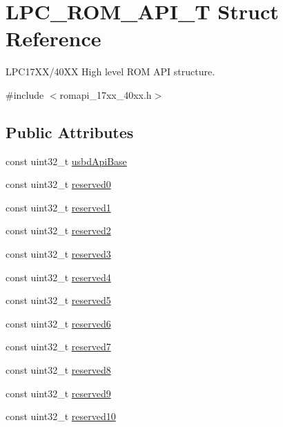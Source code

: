 \hypertarget{struct_l_p_c___r_o_m___a_p_i___t}{\section{L\+P\+C\+\_\+\+R\+O\+M\+\_\+\+A\+P\+I\+\_\+\+T Struct Reference}
\label{struct_l_p_c___r_o_m___a_p_i___t}
}


L\+P\+C17\+X\+X/40\+X\+X High level R\+O\+M A\+P\+I structure.  




{\ttfamily \#include $<$romapi\+\_\+17xx\+\_\+40xx.\+h$>$}

\subsection*{Public Attributes}
\begin{DoxyCompactItemize}
\item 
const uint32\+\_\+t \hyperlink{struct_l_p_c___r_o_m___a_p_i___t_a94bc8146ba697eeadc992d4985971550}{usbd\+Api\+Base}
\item 
const uint32\+\_\+t \hyperlink{struct_l_p_c___r_o_m___a_p_i___t_a93487c5be9000ba3b633bd6c354f8589}{reserved0}
\item 
const uint32\+\_\+t \hyperlink{struct_l_p_c___r_o_m___a_p_i___t_a2fce9202473b5986d54262b3d5548e82}{reserved1}
\item 
const uint32\+\_\+t \hyperlink{struct_l_p_c___r_o_m___a_p_i___t_a0ab9f56adf03f0f69b04baa60bcc271a}{reserved2}
\item 
const uint32\+\_\+t \hyperlink{struct_l_p_c___r_o_m___a_p_i___t_a70c7b14958f6d5af166224d04148e945}{reserved3}
\item 
const uint32\+\_\+t \hyperlink{struct_l_p_c___r_o_m___a_p_i___t_a1d3193c8ed079cf1c5006dce51686598}{reserved4}
\item 
const uint32\+\_\+t \hyperlink{struct_l_p_c___r_o_m___a_p_i___t_a1e6687c757f30d286d1ae661c0863026}{reserved5}
\item 
const uint32\+\_\+t \hyperlink{struct_l_p_c___r_o_m___a_p_i___t_a425b87f3b0f5ce258583e9e965829606}{reserved6}
\item 
const uint32\+\_\+t \hyperlink{struct_l_p_c___r_o_m___a_p_i___t_a7a9d7f0aa59c70ff085c59291594d22c}{reserved7}
\item 
const uint32\+\_\+t \hyperlink{struct_l_p_c___r_o_m___a_p_i___t_a81674fc569de19c3dd861c1f87df1d44}{reserved8}
\item 
const uint32\+\_\+t \hyperlink{struct_l_p_c___r_o_m___a_p_i___t_aae524e6f969485072d45b577c7501abc}{reserved9}
\item 
const uint32\+\_\+t \hyperlink{struct_l_p_c___r_o_m___a_p_i___t_afb1226faead704ffe1e0c7c5efcb86f2}{reserved10}
\end{DoxyCompactItemize}



